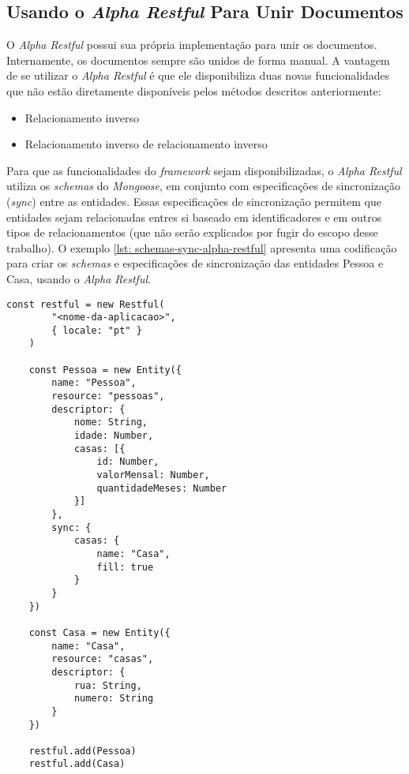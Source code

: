
\subsection{Usando o \textit{Alpha Restful} Para Unir Documentos}

O \textit{Alpha Restful} possui sua própria implementação para unir os documentos. Internamente, os documentos sempre são unidos de forma manual. A vantagem de se utilizar o \textit{Alpha Restful} é que ele disponibiliza duas novas funcionalidades que não estão diretamente disponíveis pelos métodos descritos anteriormente:

\begin{itemize}
	\item Relacionamento inverso
	\item Relacionamento inverso de relacionamento inverso
\end{itemize}

Para que as funcionalidades do \textit{framework} sejam disponibilizadas, o \textit{Alpha Restful} utiliza os \textit{schemas} do \textit{Mongoose}, em conjunto com especificações de sincronização (\textit{sync}) entre as entidades. Essas especificações de sincronização permitem que entidades sejam relacionadas entres si baseado em identificadores e em outros tipos de relacionamentos (que não serão explicados por fugir do escopo desse trabalho). O exemplo \ref{lst: schemas-sync-alpha-restful} apresenta uma codificação para criar os \textit{schemas} e especificações de sincronização das entidades Pessoa e Casa, usando o \textit{Alpha Restful}.


\begin{lstlisting}[style=ES6, caption={Definição de \textit{Schemas} no \textit{Alpha Restful}\label{lst: schemas-sync-alpha-restful}}]
    const restful = new Restful(
        "<nome-da-aplicacao>",
        { locale: "pt" }
    )

    const Pessoa = new Entity({
        name: "Pessoa",
        resource: "pessoas",
        descriptor: {
            nome: String,
            idade: Number,
            casas: [{
                id: Number,
                valorMensal: Number,
                quantidadeMeses: Number
            }]
        },
        sync: {
            casas: {
                name: "Casa",
                fill: true
            }
        }
    })
    
    const Casa = new Entity({
        name: "Casa",
        resource: "casas",
        descriptor: {
            rua: String,
            numero: String
        }
    })
    
    restful.add(Pessoa)
    restful.add(Casa)
\end{lstlisting}

